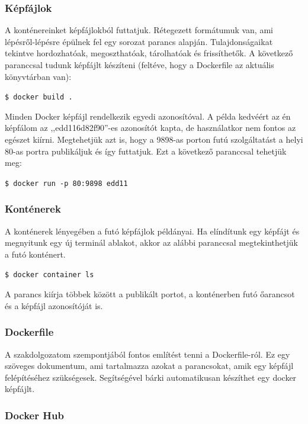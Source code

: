 \documentclass{thesis-ekf}
\theoremstyle{definition}
\theoremstyle{remark}
\begin{document}
\subsubsection{Képfájlok}

A konténereinket képfájlokból futtatjuk.
Rétegezett formátumuk van, ami lépésről-lépésre épülnek fel egy sorozat parancs alapján.
Tulajdonságaikat tekintve hordozhatóak, megoszthatóak, tárolhatóak és frissíthetők.
A következő paranccsal tudunk képfájlt készíteni (feltéve, hogy a Dockerfile az aktuális könyvtárban van):

\begin{center}
	\texttt{\$ docker build .}
\end{center}

Minden Docker képfájl rendelkezik egyedi azonosítóval.
A példa kedvéért az én képfálom az ,,edd116d82f90''-es azonosítót kapta, de használatkor nem fontos az egészet kiírni.
Megtehetjük azt is, hogy a 9898-as porton futú szolgáltatást a helyi 80-as portra publikáljuk és így futtatjuk.
Ezt a következő paranccsal tehetjük meg:

\begin{center}
	\texttt{\$ docker run -p 80:9898 edd11}
\end{center}

\subsubsection{Konténerek}

A konténerek lényegében a futó képfájlok példányai.
Ha elíndítunk egy képfájt és megnyitunk egy új terminál ablakot, akkor az alábbi paranccsal megtekinthetjük a futó konténert.

\begin{center}
	\texttt{\$ docker container ls}
\end{center}

A parancs kiírja többek között a publikált portot, a konténerben futó őarancsot és a képfájl azonosítóját is.

\subsubsection{Dockerfile}
A szakdolgozatom szempontjából fontos említést tenni a Dockerfile-ról.
Ez egy szöveges dokumentum, ami tartalmazza azokat a parancsokat, amik egy képfájl felépítéséhez szükségesek.
Segítségével bárki automatikusan készíthet egy docker képfájlt.

\subsubsection{Docker Hub}
\end{document}
